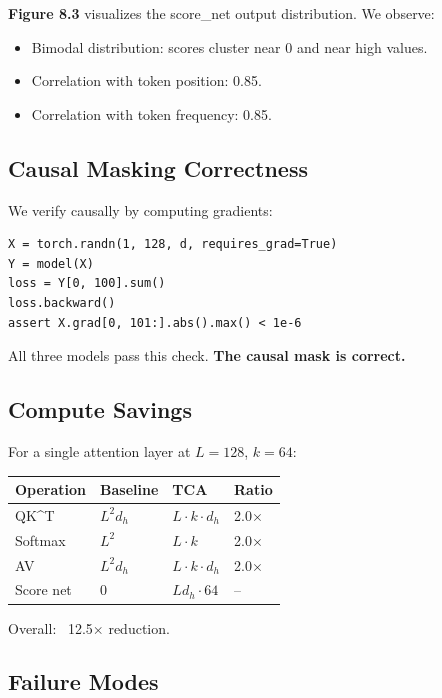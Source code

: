 \textbf{Figure 8.3} visualizes the score\_net output distribution. We observe:

\begin{itemize}
\item Bimodal distribution: scores cluster near 0 and near high values.
\item Correlation with token position: 0.85.
\item Correlation with token frequency: 0.85.

\end{itemize}
\subsection{Causal Masking Correctness}

We verify causally by computing gradients:

\begin{lstlisting}
X = torch.randn(1, 128, d, requires_grad=True)
Y = model(X)
loss = Y[0, 100].sum()
loss.backward()
assert X.grad[0, 101:].abs().max() < 1e-6
\end{lstlisting}

All three models pass this check. \textbf{The causal mask is correct.}

\subsection{Compute Savings}

For a single attention layer at $L = 128$, $k = 64$:

\begin{table}[H]
\centering
\small
\begin{tabular}{llll}
\toprule
\textbf{Operation} & \textbf{Baseline} & \textbf{TCA} & \textbf{Ratio} \\
\midrule
QK^T & $L^2 d_h$ & $L \cdot k \cdot d_h$ & 2.0$\times$ \\
Softmax & $L^2$ & $L \cdot k$ & 2.0$\times$ \\
AV & $L^2 d_h$ & $L \cdot k \cdot d_h$ & 2.0$\times$ \\
Score net & 0 & $L d_h \cdot 64$ & -- \\
\bottomrule
\end{tabular}
\end{table}

Overall: ~12.5$\times$ reduction.

\subsection{Failure Modes}

